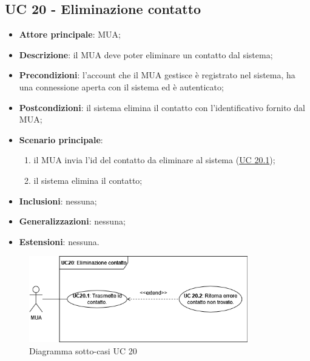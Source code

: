 \subsection{UC 20 - Eliminazione contatto} \label{sec:UC20}
    \begin{itemize}
        \item \textbf{Attore principale}: MUA;
        \item \textbf{Descrizione}: il MUA deve poter eliminare un contatto dal sistema;
        \item \textbf{Precondizioni}: l’account che il MUA gestisce è registrato nel sistema, ha una connessione aperta con il sistema ed è autenticato;
        \item \textbf{Postcondizioni}: il sistema elimina il contatto con l'identificativo fornito dal MUA;
        \item \textbf{Scenario principale}:
            \begin{enumerate}
                \item il MUA invia l'id del contatto da eliminare al sistema (\hyperref[sec:UC20.1]{UC 20.1});
                \item il sistema elimina il contatto;
            \end{enumerate}
        \item \textbf{Inclusioni}: nessuna;
        \item \textbf{Generalizzazioni}: nessuna;
        \item \textbf{Estensioni}: nessuna.
    \end{itemize}

\begin{figure}[h]
    \includegraphics[width=0.85\textwidth]{sections/uc_imgs/UC20.png}
    \centering
    \caption{Diagramma sotto-casi UC 20}
\end{figure}

